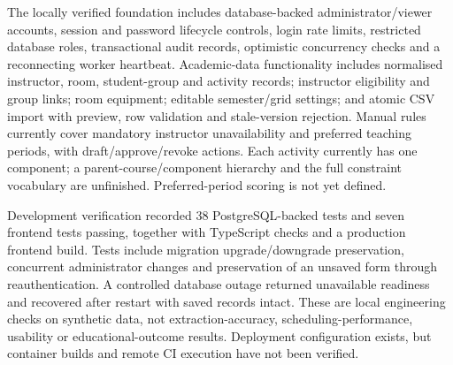 \documentclass[
  11pt,a4paper,oneside]{report}
\begin{document}
The locally verified foundation includes database-backed administrator/viewer accounts, session and password lifecycle controls, login rate limits, restricted database roles, transactional audit records, optimistic concurrency checks and a reconnecting worker heartbeat. Academic-data functionality includes normalised instructor, room, student-group and activity records; instructor eligibility and group links; room equipment; editable semester/grid settings; and atomic CSV import with preview, row validation and stale-version rejection. Manual rules currently cover mandatory instructor unavailability and preferred teaching periods, with draft/approve/revoke actions. Each activity currently has one component; a parent-course/component hierarchy and the full constraint vocabulary are unfinished. Preferred-period scoring is not yet defined.

Development verification recorded 38 PostgreSQL-backed tests and seven frontend tests passing, together with TypeScript checks and a production frontend build. Tests include migration upgrade/downgrade preservation, concurrent administrator changes and preservation of an unsaved form through reauthentication. A controlled database outage returned unavailable readiness and recovered after restart with saved records intact. These are local engineering checks on synthetic data, not extraction-accuracy, scheduling-performance, usability or educational-outcome results. Deployment configuration exists, but container builds and remote CI execution have not been verified.
\end{document}
